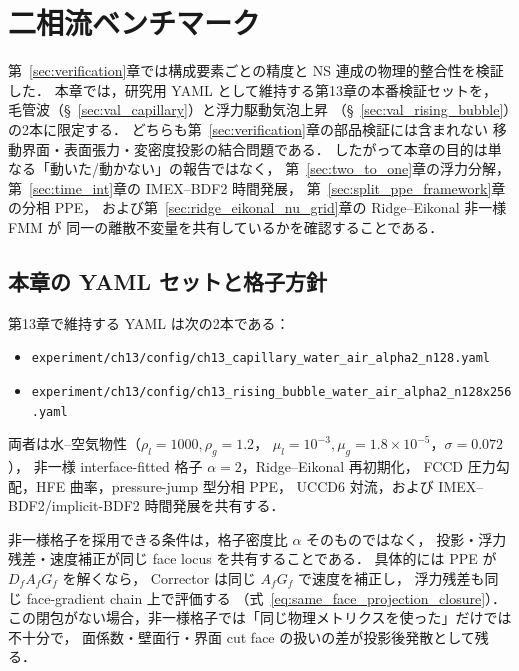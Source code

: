 %
%

\section{二相流ベンチマーク}
\label{sec:validation}
\label{sec:benchmarks}

第~\ref{sec:verification}章では構成要素ごとの精度と NS 連成の物理的整合性を検証した．
本章では，研究用 YAML として維持する第13章の本番検証セットを，
毛管波（§~\ref{sec:val_capillary}）と浮力駆動気泡上昇
（§~\ref{sec:val_rising_bubble}）の2本に限定する．
どちらも第~\ref{sec:verification}章の部品検証には含まれない
移動界面・表面張力・変密度投影の結合問題である．
したがって本章の目的は単なる「動いた/動かない」の報告ではなく，
第~\ref{sec:two_to_one}章の浮力分解，
第~\ref{sec:time_int}章の IMEX--BDF2 時間発展，
第~\ref{sec:split_ppe_framework}章の分相 PPE，
および第~\ref{sec:ridge_eikonal_nu_grid}章の Ridge--Eikonal 非一様 FMM が
同一の離散不変量を共有しているかを確認することである．

\subsection{本章の YAML セットと格子方針}
\label{sec:val_grid_policy}

第13章で維持する YAML は次の2本である：
\begin{itemize}[noitemsep,leftmargin=2em]
  \item \texttt{experiment/ch13/config/ch13\_capillary\_water\_air\_alpha2\_n128.yaml}
  \item \texttt{experiment/ch13/config/ch13\_rising\_bubble\_water\_air\_alpha2\_n128x256.yaml}
\end{itemize}
両者は水--空気物性（$\rho_l=1000,\rho_g=1.2$，
$\mu_l=10^{-3},\mu_g=1.8\times10^{-5}$，$\sigma=0.072$），
非一様 interface-fitted 格子 $\alpha=2$，Ridge--Eikonal 再初期化，
FCCD 圧力勾配，HFE 曲率，pressure-jump 型分相 PPE，
UCCD6 対流，および IMEX--BDF2/implicit-BDF2 時間発展を共有する．

非一様格子を採用できる条件は，格子密度比 $\alpha$ そのものではなく，
投影・浮力残差・速度補正が同じ face locus を共有することである．
具体的には PPE が $D_fA_fG_f$ を解くなら，
Corrector は同じ $A_fG_f$ で速度を補正し，
浮力残差も同じ face-gradient chain 上で評価する
（式~\eqref{eq:same_face_projection_closure}）．
この閉包がない場合，非一様格子では「同じ物理メトリクスを使った」だけでは不十分で，
面係数・壁面行・界面 cut face の扱いの差が投影後発散として残る．

